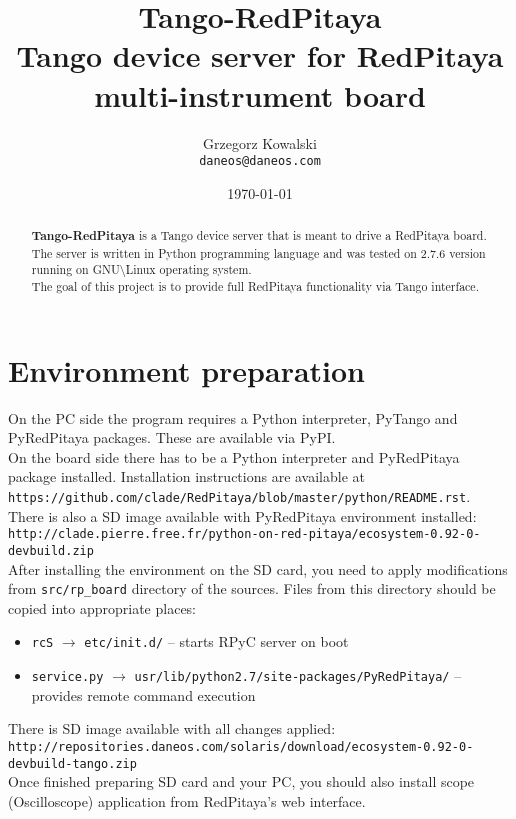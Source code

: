 \documentclass[12pt,a4paper]{article}
\title{Tango-RedPitaya\\\small{Tango device server for RedPitaya multi-instrument board}}
\author{Grzegorz Kowalski\\\texttt{daneos@daneos.com}}
\date{\today}
\begin{document}
	\maketitle
	\vspace{4em}
	
	\begin{abstract}
		\textbf{Tango-RedPitaya} is a Tango device server that is meant to drive a RedPitaya board.\\
		The server is written in Python programming language and was tested on 2.7.6 version running on GNU\textbackslash Linux operating system.\\
		The goal of this project is to provide full RedPitaya functionality via Tango interface.
	\end{abstract}

	\newpage
	\section{Environment preparation}
	On the PC side the program requires a Python interpreter, PyTango and PyRedPitaya packages. These are available via PyPI.\\
	On the board side there has to be a Python interpreter and PyRedPitaya package installed. Installation instructions are available at\\
	\texttt{\small{https://github.com/clade/RedPitaya/blob/master/python/README.rst}}.\\
	There is also a SD image available with PyRedPitaya environment installed:\\
	\texttt{\small{http://clade.pierre.free.fr/python-on-red-pitaya/ecosystem-0.92-0-devbuild.zip}}\\
	After installing the environment on the SD card, you need to apply modifications from \texttt{src/rp\_board} directory of the sources.
	Files from this directory should be copied into appropriate places:
	\begin{itemize}
		\item \texttt{\small{rcS}} $\to$ \texttt{\small{etc/init.d/}} -- starts RPyC server on boot
		\item \texttt{\small{service.py}} $\to$ \texttt{\small{usr/lib/python2.7/site-packages/PyRedPitaya/}} -- provides remote command execution
	\end{itemize}
	There is SD image available with all changes applied:\\
	\texttt{\small{http://repositories.daneos.com/solaris/download/ecosystem-0.92-0-devbuild-tango.zip}}\\
	Once finished preparing SD card and your PC, you should also install scope (Oscilloscope) application from RedPitaya's web interface.
\end{document}
